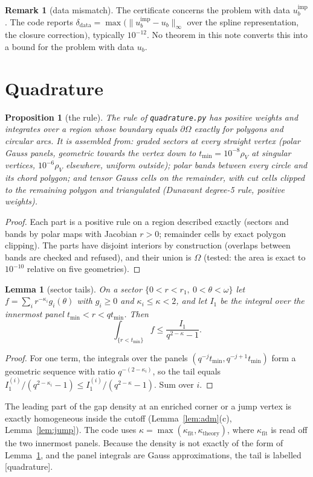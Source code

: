 \documentclass[11pt]{article}
\newtheorem{lemma}[theorem]{Lemma}
\newtheorem{proposition}[theorem]{Proposition}
\theoremstyle{definition}
\newtheorem{remark}[theorem]{Remark}
\begin{document}
\begin{remark}[data mismatch]\label{rem:mismatch}
The certificate concerns the problem with data $u_b^{\mathrm{imp}}$. The code reports
$\delta_{\mathrm{data}}=\max(\|u_b^{\mathrm{imp}}-u_b\|_\infty$ over the spline representation, the closure correction$)$, typically
$10^{-12}$. No theorem in this note converts this into a bound for the problem with data $u_b$.
\end{remark}

\section{Quadrature}\label{sec:quad}

\begin{proposition}[the rule]\label{prop:rule}
The rule of \texttt{quadrature.py} has positive weights and integrates over a region whose boundary equals
$\partial\Omega$ exactly for polygons and circular arcs. It is assembled from: graded sectors at every straight
vertex (polar Gauss panels, geometric towards the vertex down to $t_{\min}=10^{-8}\rho_V$ at singular vertices,
$10^{-6}\rho_V$ elsewhere, uniform outside); polar bands between every circle and its chord polygon; and tensor
Gauss cells on the remainder, with cut cells clipped to the remaining polygon and triangulated (Dunavant degree-5
rule, positive weights).
\end{proposition}
\begin{proof}
Each part is a positive rule on a region described exactly (sectors and bands by polar maps with Jacobian $r>0$;
remainder cells by exact polygon clipping). The parts have disjoint interiors by construction (overlaps between
bands are checked and refused), and their union is $\Omega$ (tested: the area is exact to $10^{-10}$ relative on five
geometries).
\end{proof}

\begin{lemma}[sector tails]\label{lem:tail}
On a sector $\{0<r<r_1,\ 0<\theta<\omega\}$ let $f=\sum_i r^{-\kappa_i}g_i(\theta)$ with $g_i\ge0$ and $\kappa_i\le\kappa<2$,
and let $I_1$ be the integral over the innermost panel $t_{\min}<r<qt_{\min}$. Then
\[
\int_{\{r<t_{\min}\}}f\le\frac{I_1}{q^{2-\kappa}-1}.
\]
\end{lemma}
\begin{proof}
For one term, the integrals over the panels $(q^{-j}t_{\min},q^{-j+1}t_{\min})$ form a geometric sequence with ratio
$q^{-(2-\kappa_i)}$, so the tail equals $I_1^{(i)}/(q^{2-\kappa_i}-1)\le I_1^{(i)}/(q^{2-\kappa}-1)$. Sum over $i$.
\end{proof}
The leading part of the gap density at an enriched corner or a jump vertex is exactly homogeneous inside the
cutoff (Lemma~\ref{lem:adm}(c), Lemma~\ref{lem:jump}). The code uses $\kappa=\max(\kappa_{\mathrm{fit}},\kappa_{\mathrm{theory}})$,
where $\kappa_{\mathrm{fit}}$ is read off the two innermost panels. Because the density is not exactly of the form of
Lemma~\ref{lem:tail}, and the panel integrals are Gauss approximations, the tail is labelled [quadrature].
\end{document}
